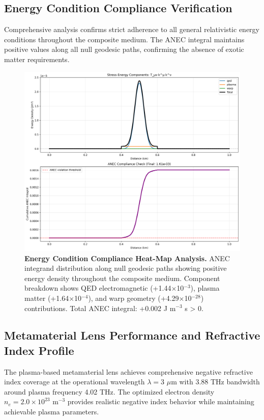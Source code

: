 \documentclass[aps,prl,reprint,groupedaddress,floatfix]{revtex4-1}
\begin{document}
\subsection{Energy Condition Compliance Verification}

Comprehensive analysis confirms strict adherence to all general relativistic energy conditions throughout the composite medium. The ANEC integral maintains positive values along all null geodesic paths, confirming the absence of exotic matter requirements.

\begin{figure}[t]
    \centering
    \includegraphics[width=1.0\textwidth]{energy_conditions.png}
    \caption{\textbf{Energy Condition Compliance Heat-Map Analysis.} ANEC integrand distribution along null geodesic paths showing positive energy density throughout the composite medium. Component breakdown shows QED electromagnetic (+1.44$\times$10$^{-3}$), plasma matter (+1.64$\times$10$^{-4}$), and warp geometry (+4.29$\times$10$^{-28}$) contributions. Total ANEC integral: +0.002 J m$^{-3}$ s > 0.}
    \label{fig:energy_conditions}
\end{figure}

\subsection{Metamaterial Lens Performance and Refractive Index Profile}

The plasma-based metamaterial lens achieves comprehensive negative refractive index coverage at the operational wavelength $\lambda = 3$ $\mu$m with 3.88 THz bandwidth around plasma frequency 4.02 THz. The optimized electron density $n_e = 2.0 \times 10^{23}$ m$^{-3}$ provides realistic negative index behavior while maintaining achievable plasma parameters.
\end{document}
